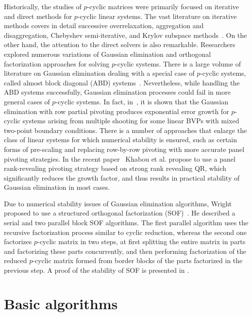 \documentclass{llncs}
\begin{document}
Historically, the studies of $p$-cyclic matrices
were primarily focused on iterative and direct methods for 
$p$-cyclic linear systems. The vast literature on iterative methods 
covers in detail successive overrelaxation,
aggregation and disaggregation,
Chebyshev semi-iterative, 
and Krylov subspace methods~\cite{Ernst00}.
On the other hand, the attention to the direct solvers 
is also remarkable.
Researchers explored numerous variations of Gaussian elimination and 
orthogonal factorization approaches for solving $p$-cyclic systems.
There is a large volume of literature on Gaussian elimination
dealing with a special case of $p$-cyclic systems, 
called almost block diagonal (ABD) systems~\cite{Wright92BSOF}.
Nevertheless, 
while handling the ABD systems successfully, 
Gaussian elimination processes could fail 
in more general cases of $p$-cyclic systems.
In fact, in~\cite{Wright93}, it is shown that 
the Gaussian elimination with row partial pivoting
produces exponential error growth
for $p$-cyclic systems arising from multiple shooting for 
some linear BVPs with mixed two-point boundary conditions. 
There is a number of approaches that enlarge the class of linear systems
for which numerical stability is ensured, 
such as certain forms of pre-scaling
and replacing row-by-row pivoting with 
more accurate panel pivoting strategies.
In the recent paper~\cite{KhabouDGG13} Khabou et al.
propose to use a panel rank-revealing pivoting strategy 
based on strong rank revealing QR, 
which significantly reduces the growth factor, and 
thus results in practical stability of Gaussian elimination
in most cases.

Due to numerical stability issues of Gaussian elimination algorithms, 
Wright proposed to use a structured orthogonal 
factorization (SOF)~\cite{Wright92BSOF}.
He described a serial and two parallel block SOF algorithms. 
The first parallel algorithm uses the recursive factorization 
process similar to cyclic reduction,
whereas the second one factorizes $p$-cyclic matrix in two steps,
at first splitting the entire matrix in parts and factorizing these 
parts concurrently, and then performing factorization of the reduced 
$p$-cyclic matrix formed from border blocks of the parts factorized 
in the previous step.  A proof of the stability of 
SOF is presented in \cite{Wright92BSOF}.

\section{Basic algorithms}
\label{sec:algorithm}
\end{document}
